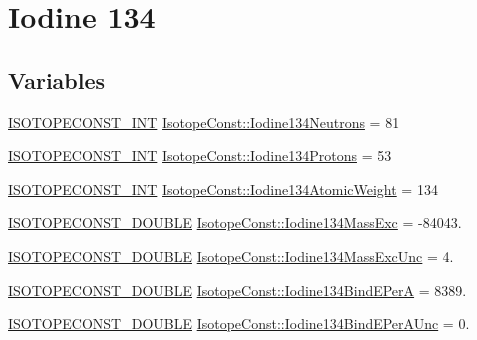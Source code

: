 \hypertarget{group___isotope_const-_iodine-_i134}{}\section{Iodine 134}
\label{group___isotope_const-_iodine-_i134}
\subsection*{Variables}
\begin{DoxyCompactItemize}
\item 
\mbox{\hyperlink{group___isotope_const-_macros_ga5f18360b3e99483a35c32d789e62621c}{I\+S\+O\+T\+O\+P\+E\+C\+O\+N\+S\+T\+\_\+\+I\+NT}} \mbox{\hyperlink{group___isotope_const-_iodine-_i134_ga6fc880a1989d98062f5e6bcecbf4f7bf}{Isotope\+Const\+::\+Iodine134\+Neutrons}} = 81
\item 
\mbox{\hyperlink{group___isotope_const-_macros_ga5f18360b3e99483a35c32d789e62621c}{I\+S\+O\+T\+O\+P\+E\+C\+O\+N\+S\+T\+\_\+\+I\+NT}} \mbox{\hyperlink{group___isotope_const-_iodine-_i134_gadf0a025073f1e6bf84803a04aab7ed31}{Isotope\+Const\+::\+Iodine134\+Protons}} = 53
\item 
\mbox{\hyperlink{group___isotope_const-_macros_ga5f18360b3e99483a35c32d789e62621c}{I\+S\+O\+T\+O\+P\+E\+C\+O\+N\+S\+T\+\_\+\+I\+NT}} \mbox{\hyperlink{group___isotope_const-_iodine-_i134_ga52a8e81f01332b1feee4a5b7215abf9c}{Isotope\+Const\+::\+Iodine134\+Atomic\+Weight}} = 134
\item 
\mbox{\hyperlink{group___isotope_const-_macros_ga8f45a7272ce02c0b4c65c44636ed719a}{I\+S\+O\+T\+O\+P\+E\+C\+O\+N\+S\+T\+\_\+\+D\+O\+U\+B\+LE}} \mbox{\hyperlink{group___isotope_const-_iodine-_i134_ga7a00c87a48e5dd9095968128077c68e5}{Isotope\+Const\+::\+Iodine134\+Mass\+Exc}} = -\/84043.
\item 
\mbox{\hyperlink{group___isotope_const-_macros_ga8f45a7272ce02c0b4c65c44636ed719a}{I\+S\+O\+T\+O\+P\+E\+C\+O\+N\+S\+T\+\_\+\+D\+O\+U\+B\+LE}} \mbox{\hyperlink{group___isotope_const-_iodine-_i134_gac30e3823eef2d9bd20465c74f7c6f829}{Isotope\+Const\+::\+Iodine134\+Mass\+Exc\+Unc}} = 4.
\item 
\mbox{\hyperlink{group___isotope_const-_macros_ga8f45a7272ce02c0b4c65c44636ed719a}{I\+S\+O\+T\+O\+P\+E\+C\+O\+N\+S\+T\+\_\+\+D\+O\+U\+B\+LE}} \mbox{\hyperlink{group___isotope_const-_iodine-_i134_ga4e7243321735f583a65f498cb819b797}{Isotope\+Const\+::\+Iodine134\+Bind\+E\+PerA}} = 8389.
\item 
\mbox{\hyperlink{group___isotope_const-_macros_ga8f45a7272ce02c0b4c65c44636ed719a}{I\+S\+O\+T\+O\+P\+E\+C\+O\+N\+S\+T\+\_\+\+D\+O\+U\+B\+LE}} \mbox{\hyperlink{group___isotope_const-_iodine-_i134_gad8e834cd2eebad780a6045a055fc3cb1}{Isotope\+Const\+::\+Iodine134\+Bind\+E\+Per\+A\+Unc}} = 0.

\end{DoxyCompactItemize}
